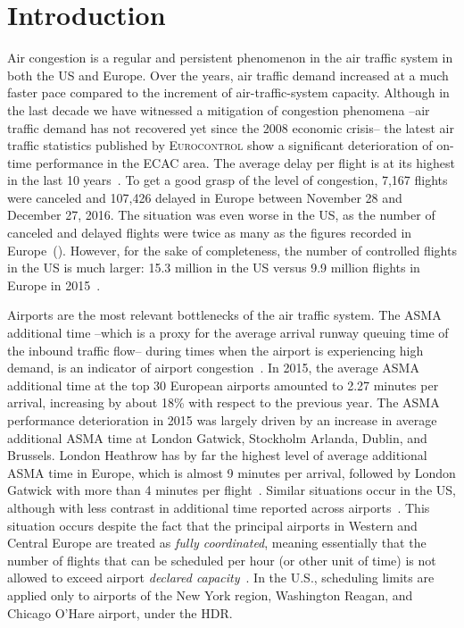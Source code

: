 \documentclass[draft,review]{elsarticle}
\begin{document}

\section{Introduction}
\label{sec:introduction}

Air congestion is a regular and persistent phenomenon in the air traffic system in both the US and Europe.
Over the years, air traffic demand increased at a much faster pace compared to the increment of air-traffic-system capacity.
Although in the last decade we have witnessed a mitigation of congestion phenomena --air traffic demand has not recovered yet since the 2008 economic crisis-- the latest air traffic statistics published by \textsc{Eurocontrol} show a significant deterioration of on-time performance in the \acl{ECAC} area.
The average delay per flight is at its highest in the last 10 years~\citep{coda2016}.
To get a good grasp of the level of congestion, 7,167 flights were canceled and 107,426  delayed in Europe between November 28 and December 27, 2016.
The situation was even worse in the US, as the number of canceled and delayed flights were twice as many as the figures recorded in Europe~(\citeauthor{flightstats}).
However, for the sake of completeness, the number of controlled flights in the US is much larger: 15.3 million  in the US versus 9.9 million flights in Europe in 2015~\citep{EUCTRL-FAA2015}.

Airports are the most relevant bottlenecks of the air traffic system. The \ac{ASMA} additional time --which is a proxy for the average arrival runway queuing time of the inbound traffic flow-- during times when the airport is experiencing high demand, is an indicator of airport congestion~\citep{ASMA-def}. In 2015, the average \acs{ASMA} additional time at the top 30 European airports amounted to  2.27 minutes per arrival, increasing by about 18\% with respect to the previous year.
The \ac{ASMA} performance deterioration in 2015 was largely driven by an increase in average additional \ac{ASMA} time at London Gatwick, Stockholm Arlanda, Dublin, and Brussels.
London Heathrow has by far the highest level of average additional \ac{ASMA} time in Europe, which is almost 9 minutes per arrival, followed by London Gatwick with more than 4 minutes per flight~\citep{PRR2015}.
Similar situations occur in the US, although with less contrast in additional time reported across airports~\citep{EUCTRL-FAA2015}.
This situation occurs despite the fact that the principal airports in Western and Central Europe are treated as \emph{fully coordinated}, meaning essentially that the number of flights that can be scheduled per hour (or other unit of time) is not allowed to exceed airport \emph{declared capacity}~\citep{deNO2003}.
In the U.S., scheduling limits are applied only to airports of the New York region, Washington Reagan, and Chicago O'Hare airport, under the \acl{HDR}.
\end{document}
